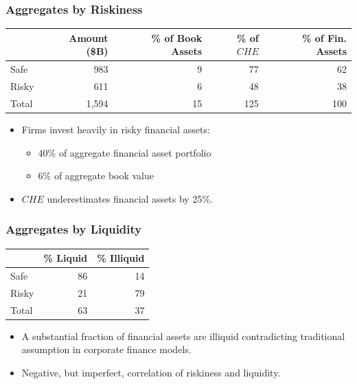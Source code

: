 \documentclass[handout]{beamer}
\begin{document}
\begin{frame}
\frametitle{Aggregates by Riskiness}

\footnotesize

\begin{center}
\begin{tabular}{ l | r r r r }
& Amount (\$B) & \% of Book Assets & \% of $CHE$ & \% of Fin. Assets\\ 
\hline
 Safe  & 983 & 9 & 77 & 62 \\  
 Risky & 611 & 6 & 48 & 38 \\
 \hline
 Total & 1,594 & 15 & 125 & 100
\end{tabular}
\end{center}

\normalsize
\begin{itemize}[<+->]
\item Firms invest heavily in risky financial assets:
\begin{itemize}[<+->]
\item 40\% of aggregate financial asset portfolio
\item 6\% of aggregate book value
\end{itemize}
\bigskip
\item $CHE$ underestimates financial assets by 25\%.
\end{itemize}

\end{frame}




\begin{frame}
\frametitle{Aggregates by Liquidity}

\footnotesize

\begin{center}
\begin{tabular}{ l | r r}
& \% Liquid & \% Illiquid \\ 
\hline
 Safe  & 86 & 14 \\  
 Risky & 21 & 79 \\
 \hline
 Total & 63 & 37
\end{tabular}
\end{center}

\normalsize

\begin{itemize}[<+->]
\item A substantial fraction of financial assets are illiquid contradicting traditional assumption in corporate finance models.
\bigskip
\item Negative, but imperfect, correlation of riskiness and liquidity.
\end{itemize}

\end{frame}
\end{document}
